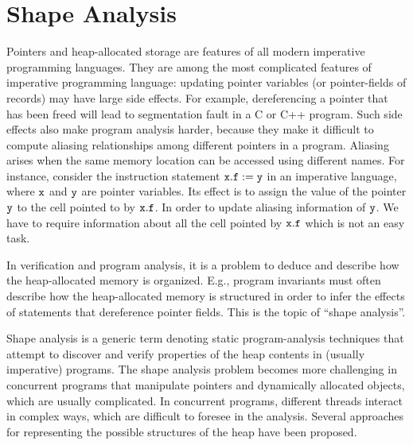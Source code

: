 
\chapter{Shape Analysis}
Pointers and heap-allocated storage are features of all modern imperative programming languages.
They are among the most
complicated features of imperative programming language:
updating pointer variables (or pointer-fields of records) may have large side effects.
For example, dereferencing a pointer that has been freed will lead to segmentation fault in a C or C++ program.
Such side effects also make program analysis harder, because they make it
difficult to compute aliasing relationships among different pointers in a program. Aliasing arises when the same memory location can be accessed using different names.
For instance, consider the instruction statement $\tt x.f := y$ in an imperative language, where $\tt x$ and $\tt y$ are pointer variables. Its effect is to assign the value of the pointer $\tt y$ to the cell pointed to by $\tt x.f$. In order to update aliasing information of $\tt y$. We have to require information about all the cell pointed by $\tt x.f$ which is not an easy task.

In verification and program analysis, it is a problem to deduce and describe  how the heap-allocated memory is organized. E.g., program invariants must often describe how the heap-allocated memory is structured in order to infer the effects of statements that dereference pointer fields. This is the topic of ``shape analysis''.


Shape analysis is a generic term denoting static
program-analysis techniques that attempt to discover and verify properties of the heap contents in (usually imperative) programs. The shape analysis problem becomes more challenging in concurrent programs that manipulate pointers and dynamically allocated objects, which are usually complicated. 
In concurrent programs, different threads interact in complex ways, which are difficult to foresee in the analysis. Several approaches for representing the possible structures of the heap have been proposed.

 
